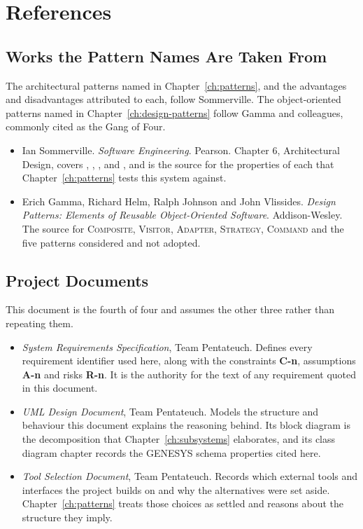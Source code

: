 \chapter{References}
\label{ch:references}

\section{Works the Pattern Names Are Taken From}

The architectural patterns named in Chapter~\ref{ch:patterns}, and the
advantages and disadvantages attributed to each, follow Sommerville. The
object-oriented patterns named in Chapter~\ref{ch:design-patterns} follow Gamma
and colleagues, commonly cited as the Gang of Four.

\begin{itemize}
	\item Ian Sommerville. \emph{Software Engineering}. Pearson. Chapter 6,
	      Architectural Design, covers ,
	      , ,  and
	      , and is the source for the properties of each that
	      Chapter~\ref{ch:patterns} tests this system against.
	\item Erich Gamma, Richard Helm, Ralph Johnson and John Vlissides.
	      \emph{Design Patterns: Elements of Reusable Object-Oriented
	      Software}. Addison-Wesley. The source for \textsc{Composite},
	      \textsc{Visitor}, \textsc{Adapter}, \textsc{Strategy},
	      \textsc{Command} and the five patterns considered and not adopted.
\end{itemize}

\section{Project Documents}

This document is the fourth of four and assumes the other three rather than
repeating them.

\begin{itemize}
	\item \emph{System Requirements Specification}, Team Pentateuch. Defines
	      every requirement identifier used here, along with the constraints
	      \textbf{C-n}, assumptions \textbf{A-n} and risks \textbf{R-n}. It is
	      the authority for the text of any requirement quoted in this
	      document.
	\item \emph{UML Design Document}, Team Pentateuch. Models the structure and
	      behaviour this document explains the reasoning behind. Its block
	      diagram is the decomposition that Chapter~\ref{ch:subsystems}
	      elaborates, and its class diagram chapter records the GENESYS schema
	      properties cited here.
	\item \emph{Tool Selection Document}, Team Pentateuch. Records which
	      external tools and interfaces the project builds on and why the
	      alternatives were set aside. Chapter~\ref{ch:patterns} treats those
	      choices as settled and reasons about the structure they imply.
\end{itemize}

